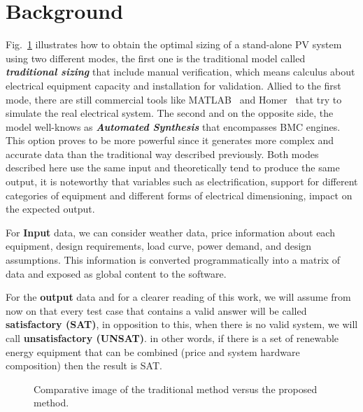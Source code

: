 \documentclass[10pt,journal,compsoc]{IEEEtran}
\begin{document}
\section{Background}
\label{sec:AutomatedVerification}
\vspace{-1ex}\color{blue}
Fig.~\ref{fig:optimization} illustrates how to obtain the optimal sizing of a stand-alone PV system using two different modes, the first one is the traditional model called \textit{\textbf{traditional sizing}} that include manual verification, which means calculus about electrical equipment capacity and installation for validation. Allied to the first mode, there are still commercial tools like MATLAB~\cite{Benatiallah2017} and Homer~\cite{Pradhan,Swarnkar} that try to simulate the real electrical system. The second and on the opposite side, the model well-knows as \textbf{\textit{Automated Synthesis}} that encompasses BMC engines. This option proves to be more powerful since it generates more complex and accurate data than the traditional way described previously.
Both modes described here use the same input and theoretically tend to produce the same output, it is noteworthy that variables such as electrification, support for different categories of equipment and different forms of electrical dimensioning, impact on the expected output.

For \textbf{Input} data, we can consider weather data, price information about each equipment, design requirements, load curve, power demand, and design assumptions. This information is converted programmatically into a matrix of data and exposed as global content to the software.

For the \textbf{output} data and for a clearer reading of this work, we will assume from now on that every test case that contains a valid answer will be called \textbf{satisfactory (SAT)}, in opposition to this, when there is no valid system, we will call \textbf{unsatisfactory (UNSAT)}. in other words, if there is a set of renewable energy equipment that can be combined (price and system hardware composition) then the result is SAT.

%
\begin{figure}[h]
\centering
\caption{Comparative image of the traditional method versus the proposed method.}
\label{fig:optimization}
\end{figure}
\end{document}
